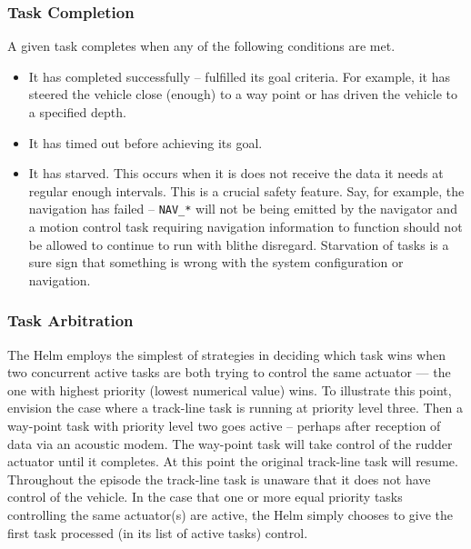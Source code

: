 \documentclass[a4paper,10pt]{article}
\newcommand{\Code}[1]{\texttt{#1} }
\newcommand{\code}[1]{\Code{#1} }
\begin{document}
\subsubsection{Task Completion}
A given task completes when any of the following conditions are
met.
\begin{itemize}
\item It has completed successfully -- fulfilled its goal criteria.
For example, it has steered the vehicle close (enough) to a way
point or has driven the vehicle to a specified depth.
\item It has timed out before achieving its goal.
\item It has starved. This occurs when it is does not receive the
data it needs at regular enough intervals. This is a crucial
safety feature. Say, for example, the navigation has failed --
\code{NAV\_*} will not be being emitted by the navigator and a
motion control task requiring navigation information to function
should not be allowed to continue to run with blithe disregard.
Starvation of tasks is a sure sign that something is wrong with
the system configuration or navigation.
\end{itemize}

\subsubsection{Task Arbitration}
The Helm employs the simplest of strategies in deciding which task
wins when two concurrent active tasks are both trying to control
the same actuator --- the one with highest priority (lowest
numerical value) wins. To illustrate this point, envision the case
where a track-line task is running at priority level three. Then a
way-point task with priority level two goes active -- perhaps after
reception of data via an acoustic modem. The way-point task will
take control of the rudder actuator until it completes. At this
point the original track-line task will resume. Throughout the
episode the track-line task is unaware that it does not have
control of the vehicle. In the case that one or more equal
priority tasks controlling the same actuator(s) are active, the
Helm simply chooses to give the first task processed (in its list
of active tasks) control.
\end{document}
